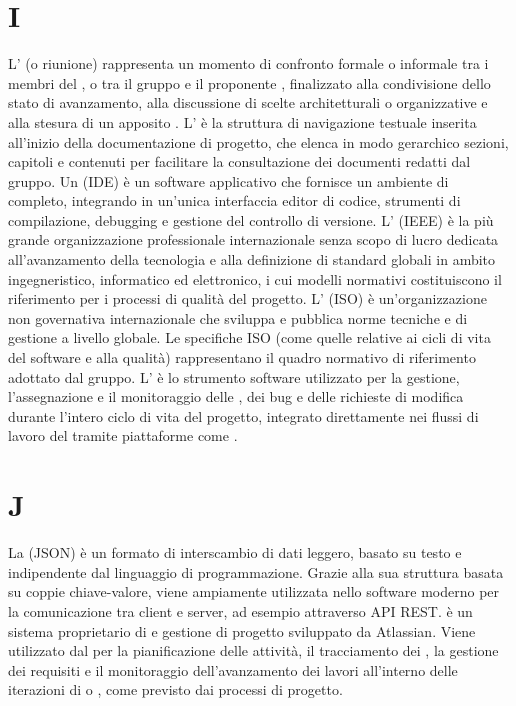 \section{I}
L' (o riunione) rappresenta un momento di confronto formale o informale tra i membri del , o tra il gruppo e il proponente , finalizzato alla condivisione dello stato di avanzamento, alla discussione di scelte architetturali o organizzative e alla stesura di un apposito .
L' è la struttura di navigazione testuale inserita all'inizio della documentazione di progetto, che elenca in modo gerarchico sezioni, capitoli e contenuti per facilitare la consultazione dei documenti redatti dal gruppo.
Un  (IDE) è un software applicativo che fornisce un ambiente di  completo, integrando in un'unica interfaccia editor di codice, strumenti di compilazione, debugging e gestione del controllo di versione.
L' (IEEE) è la più grande organizzazione professionale internazionale senza scopo di lucro dedicata all'avanzamento della tecnologia e alla definizione di standard globali in ambito ingegneristico, informatico ed elettronico, i cui modelli normativi costituiscono il riferimento per i processi di qualità del progetto.
L' (ISO) è un'organizzazione non governativa internazionale che sviluppa e pubblica norme tecniche e di gestione a livello globale. Le specifiche ISO (come quelle relative ai cicli di vita del software e alla qualità) rappresentano il quadro normativo di riferimento adottato dal gruppo.
L' è lo strumento software utilizzato per la gestione, l'assegnazione e il monitoraggio delle , dei bug e delle richieste di modifica durante l'intero ciclo di vita del progetto, integrato direttamente nei flussi di lavoro del  tramite piattaforme come .
\section{J}
La  (JSON) è un formato di interscambio di dati leggero, basato su testo e indipendente dal linguaggio di programmazione. Grazie alla sua struttura basata su coppie chiave-valore, viene ampiamente utilizzata nello  software moderno per la comunicazione tra client e server, ad esempio attraverso API REST.
 è un sistema proprietario di  e gestione di progetto sviluppato da Atlassian. Viene utilizzato dal  per la pianificazione delle attività, il tracciamento dei , la gestione dei requisiti e il monitoraggio dell'avanzamento dei lavori all'interno delle iterazioni di  o , come previsto dai processi di progetto.
